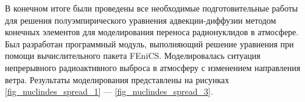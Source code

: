 В конечном итоге были проведены все необходимые подготовительные работы для решения полуэмпирического уравнения 
адвекции-диффузии методом конечных элементов для моделирования переноса радионуклидов в атмосфере. Был разработан 
программный модуль, выполняющий решение уравнения при помощи вычислительного пакета FEniCS. Моделировалась ситуация 
непрерывного радиоактивного выброса в атмосферу с изменением направления ветра. 
Результаты моделирования представлены на рисунках \ref{fig_nuclindes_spread_1} --- \ref{fig_nuclindes_spread_3}.